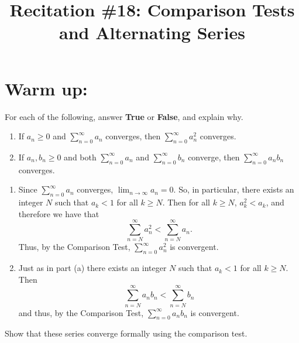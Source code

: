 \documentclass[handout]{ximera}
\title{Recitation \#18: Comparison Tests and Alternating Series}
\begin{document}
\begin{abstract}		\end{abstract}
\maketitle



\section{Warm up:}
For each of the following, answer {\bf True} or {\bf False}, and explain why.
	\begin{enumerate}
	
	\item  If $a_n \geq 0$ and $\sum_{n=0}^\infty a_n$ converges, then $\sum_{n=0}^\infty a_n^2$ converges.
	
	\item  If $a_n, b_n \geq 0$ and both $\sum_{n=0}^\infty a_n$ and $\sum_{n=0}^\infty b_n$ converge, then $\sum_{n=0}^\infty a_n b_n$ converges. 
	
	\end{enumerate}
	
	\begin{freeResponse}
		\begin{enumerate}
		
		\item  {}
		
		Since $\sum_{n=0}^\infty a_n$ converges, $\lim_{n \to \infty} a_n = 0$.  
		So, in particular, there exists an integer $N$ such that $a_k < 1$ for all $k \geq N$.  
		Then for all $k \geq N$, $a_k^2 < a_k$, and therefore we have that
			\[
			\sum_{n=N}^\infty a_n^2 < \sum_{n=N}^\infty a_n.
			\]
		Thus,  by the Comparison Test, $\sum_{n=0}^\infty a_n^2$ is convergent.
		
		
		
		\item  {}
		
		Just as in part (a) there exists an integer $N$ such that $a_k < 1$ for all $k \geq N$.  
		Then
			\[
			\sum_{n=N}^\infty a_n b_n < \sum_{n=N}^\infty b_n
			\]
		and thus, by the Comparison Test, $\sum_{n=0}^\infty a_n b_n$ is convergent.
		
		\end{enumerate}
	\end{freeResponse}
	
\begin{instructorNotes}
Show that these series converge formally using the comparison test.
\end{instructorNotes}
\end{document}
